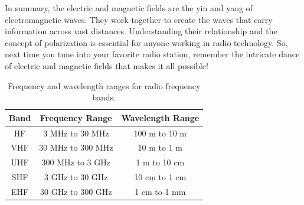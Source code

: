 In summary, the electric and magnetic fields are the yin and yang of electromagnetic waves. They work together to create the waves that carry information across vast distances. Understanding their relationship and the concept of polarization is essential for anyone working in radio technology. So, next time you tune into your favorite radio station, remember the intricate dance of electric and magnetic fields that makes it all possible!

\begin{table}[h]
    \centering
    \begin{tabular}{|c|c|c|}
        \hline
        \textbf{Band} & \textbf{Frequency Range} & \textbf{Wavelength Range} \\
        \hline
        HF & 3 MHz to 30 MHz & 100 m to 10 m \\
        VHF & 30 MHz to 300 MHz & 10 m to 1 m \\
        UHF & 300 MHz to 3 GHz & 1 m to 10 cm \\
        SHF & 3 GHz to 30 GHz & 10 cm to 1 cm \\
        EHF & 30 GHz to 300 GHz & 1 cm to 1 mm \\
        \hline
    \end{tabular}
    \caption{Frequency and wavelength ranges for radio frequency bands.}
    \label{tab:frequency-ranges}
\end{table}
